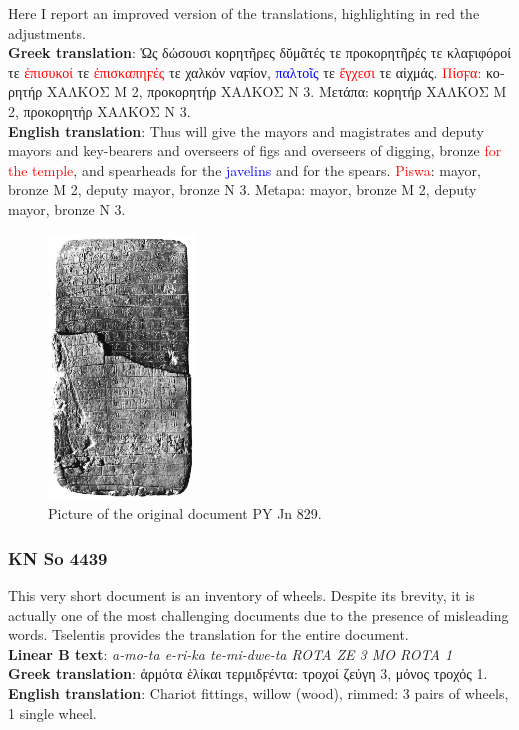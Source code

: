 Here I report an improved version of the translations, highlighting in red the adjustments. \\
\textbf{Greek translation}: \textgreek{Ὡς δώσουσι κορητῆρες δῠμᾶτές τε προκορητῆρές τε κλαϝιφόροί τε} \textcolor{red}{\textgreek{ἐπισυκοί}} \textgreek{τε} \textcolor{red}{\textgreek{ἐπισκαπηϝές}} \textgreek{τε χαλκόν ναϝίον,} \textcolor{blue}{\textgreek{παλτοῖς}} \textgreek{τε} \textcolor{red}{\textgreek{ἔγχεσι}} \textgreek{τε αἰχμάς.} \textcolor{red}{\textgreek{Πίσϝα:}} \textgreek{κορητήρ ΧΑΛΚΟΣ M 2, προκορητήρ ΧΑΛΚΟΣ N 3. Μετάπα: κορητήρ ΧΑΛΚΟΣ M 2, προκορητήρ ΧΑΛΚΟΣ N 3.} \\
\textbf{English translation}: Thus will give the mayors and magistrates and deputy mayors and key-bearers and overseers of figs and overseers of digging, bronze \textcolor{red}{for the temple}, and spearheads for the \textcolor{blue}{javelins} and for the spears. \textcolor{red}{Piswa}: mayor, bronze M 2, deputy mayor, bronze N 3. Metapa: mayor, bronze M 2, deputy mayor, bronze N 3.

\begin{figure}[H]
  \centering
  \includegraphics[width=0.35\textwidth]{Images/5072.png} %
  \caption{Picture of the original document PY Jn 829.}
  \label{fig:doc4}
\end{figure}

\subsubsection{KN So 4439} \label{doc:knso4439}
This very short document is an inventory of wheels.
Despite its brevity, it is actually one of the most challenging documents due to the presence of misleading words.
Tselentis provides the translation for the entire document. \\
\textbf{Linear B text}: \textit{a-mo-ta e-ri-ka te-mi-dwe-ta ROTA ZE 3 MO ROTA 1} \\
\textbf{Greek translation}: \textgreek{ἁρμότα ἑλίκαι τερμιδϝέντα: τροχοί ζεύγη 3, μόνος τροχός 1.} \\
\textbf{English translation}: Chariot fittings, willow (wood), rimmed: 3 pairs of wheels, 1 single wheel.

